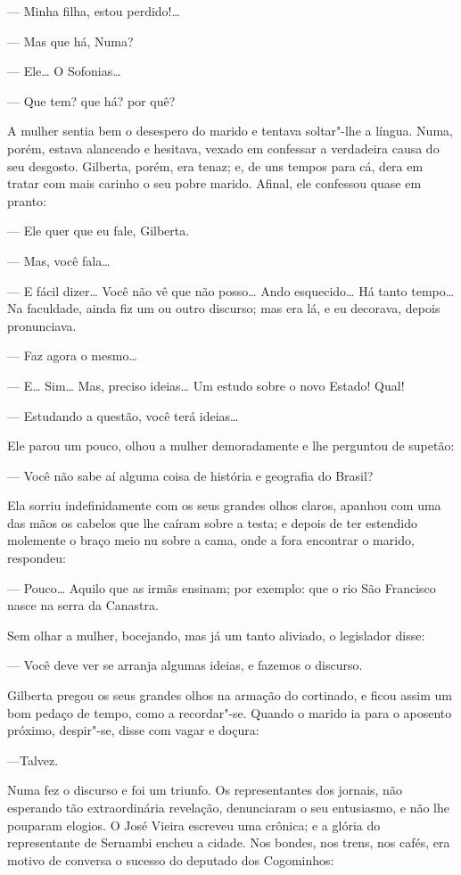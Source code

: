 --- Minha filha, estou perdido!\ldots{}

--- Mas que há, Numa?

--- Ele\ldots{} O Sofonias\ldots{}

--- Que tem? que há? por quê?

A mulher sentia bem o desespero do marido e tentava soltar"-lhe a língua.
Numa, porém, estava alanceado e hesitava, vexado em confessar a
verdadeira causa do seu desgosto. Gilberta, porém, era tenaz; e, de uns
tempos para cá, dera em tratar com mais carinho o seu pobre marido.
Afinal, ele confessou quase em pranto:

--- Ele quer que eu fale, Gilberta.

--- Mas, você fala\ldots{}

--- E fácil dizer\ldots{} Você não vê que não posso\ldots{} Ando
esquecido\ldots{} Há tanto tempo\ldots{} Na faculdade, ainda fiz um ou
outro discurso; mas era lá, e eu decorava, depois pronunciava.

--- Faz agora o mesmo\ldots{}

--- E\ldots{} Sim\ldots{} Mas, preciso ideias\ldots{} Um estudo sobre o
novo Estado! Qual!

--- Estudando a questão, você terá ideias\ldots{}

Ele parou um pouco, olhou a mulher demoradamente e lhe perguntou de
supetão:

--- Você não sabe aí alguma coisa de história e geografia do Brasil?

Ela sorriu indefinidamente com os seus grandes olhos claros, apanhou com
uma das mãos os cabelos que lhe caíram sobre a testa; e depois de ter
estendido molemente o braço meio nu sobre a cama, onde a fora encontrar
o marido, respondeu:

--- Pouco\ldots{} Aquilo que as irmãs ensinam; por exemplo: que o rio
São Francisco nasce na serra da Canastra.

Sem olhar a mulher, bocejando, mas já um tanto aliviado, o legislador
disse:

--- Você deve ver se arranja algumas ideias, e fazemos o discurso.

Gilberta pregou os seus grandes olhos na armação do cortinado, e ficou
assim um bom pedaço de tempo, como a recordar"-se. Quando o marido ia
para o aposento próximo, despir"-se, disse com vagar e doçura:

---Talvez.

Numa fez o discurso e foi um triunfo. Os representantes dos jornais, não
esperando tão extraordinária revelação, denunciaram o seu entusiasmo, e
não lhe pouparam elogios. O José Vieira escreveu uma crônica; e a glória
do representante de Sernambi encheu a cidade. Nos bondes, nos trens, nos
cafés, era motivo de conversa o sucesso do deputado dos Cogominhos:

